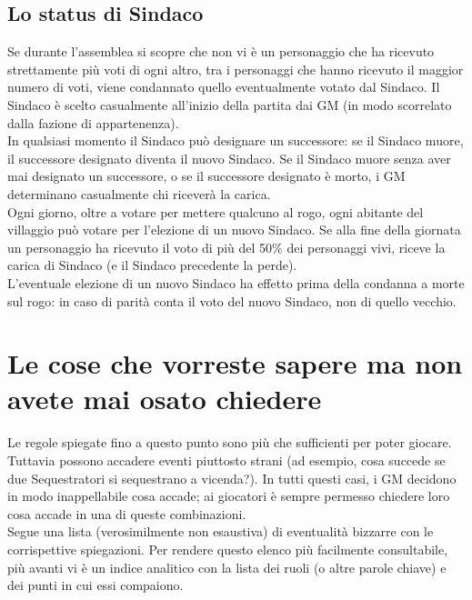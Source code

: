 \documentclass[a4paper,10pt]{article}
\begin{document}
\subsection{Lo status di Sindaco}
\label{sindaco}

Se durante l'assemblea si scopre che non vi è un personaggio che ha ricevuto
strettamente più voti di ogni altro, tra i personaggi che hanno ricevuto il
maggior numero di voti, viene condannato quello eventualmente votato dal
Sindaco.
Il Sindaco è scelto casualmente all'inizio della partita dai GM (in modo
scorrelato dalla fazione di appartenenza).
\\
In qualsiasi momento il Sindaco può designare un successore: se il Sindaco
muore, il successore designato diventa il nuovo Sindaco. Se il Sindaco muore
senza aver mai designato un successore, o se il successore designato è morto, i
GM determinano casualmente chi riceverà la carica.
\\
Ogni giorno, oltre a votare per mettere qualcuno al rogo, ogni abitante del
villaggio può votare per l'elezione di un nuovo Sindaco. Se alla fine della
giornata un personaggio ha ricevuto il voto di più del 50\% dei personaggi vivi,
riceve la carica di Sindaco (e il Sindaco precedente la perde).
\\
L'eventuale elezione di un nuovo Sindaco ha effetto prima della condanna a morte
sul rogo: in caso di parità conta il voto del nuovo Sindaco, non di quello
vecchio.






\section{Le cose che vorreste sapere ma non avete mai osato chiedere}
\label{faq}

Le regole spiegate fino a questo punto sono più che sufficienti per poter
giocare. Tuttavia possono accadere eventi piuttosto strani (ad esempio, cosa
succede se due Sequestratori si sequestrano a vicenda?). In tutti questi casi, i
GM decidono in modo inappellabile cosa accade; ai giocatori è sempre permesso
chiedere loro cosa accade in una di queste combinazioni.
\vspace{1.5 mm}\\
Segue una lista (verosimilmente non esaustiva) di eventualità bizzarre con le
corrispettive spiegazioni.
Per rendere questo elenco più facilmente consultabile, più avanti vi è un indice
analitico con la lista dei ruoli (o altre parole chiave) e dei punti in cui essi
compaiono.
\end{document}
